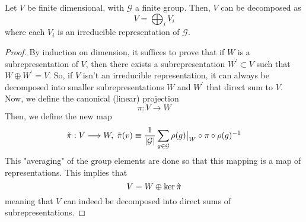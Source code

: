   \begin{theorem}
    Let $V$ be finite dimensional, with $\mathcal{G}$ a finite group. Then, $V$ can be decomposed as 
    \begin{equation}
      V = \bigoplus_{i} V_i
    \end{equation}
    where each $V_i$ is an irreducible representation of $\mathcal{G}$. 
  \end{theorem}
  \begin{proof}
    By induction on dimension, it suffices to prove that if $W$ is a subrepresentation of $V$, then there exists a subrepresentation $W^\prime \subset V$ such that $W \oplus W^\prime = V$. So, if $V$ isn't an irreducible representation, it can always be decomposed into smaller subrepresentations $W$ and $W^\prime$ that direct sum to $V$. Now, we define the canonical (linear) projection 
    \begin{equation}
      \pi: V \longrightarrow W
    \end{equation}
    Then, we define the new map 
    \begin{equation}
      \Tilde{\pi}: V \longrightarrow W, \; \Tilde{\pi}(v) \equiv \frac{1}{|\mathcal{G}|} \sum_{g \in \mathcal{G}} \rho(g)\big|_W \circ \pi \circ \rho(g)^{-1}
    \end{equation}
    This "averaging" of the group elements are done so that this mapping is a map of representations. This implies that 
    \begin{equation}
      V = W \oplus \ker{\Tilde{\pi}}
    \end{equation}
    meaning that $V$ can indeed be decomposed into direct sums of subrepresentations. 
  \end{proof}

